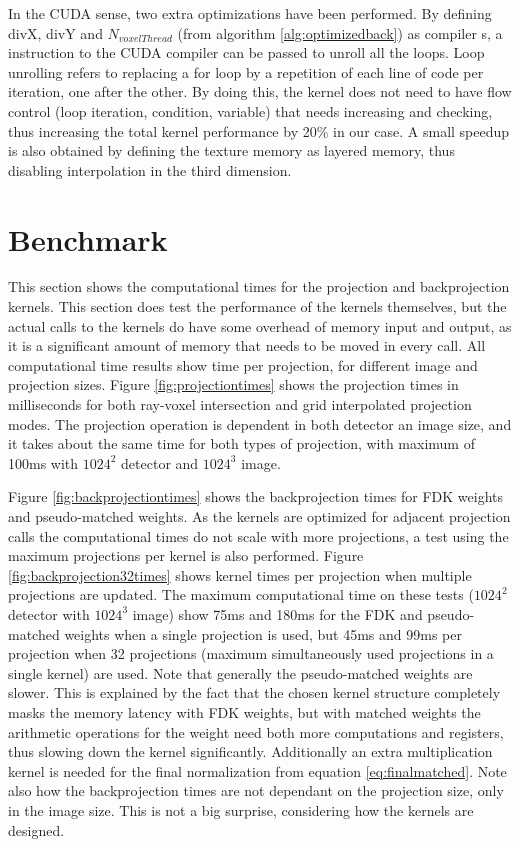 In the CUDA sense, two extra optimizations have been performed. By defining divX, divY and $N_{voxelThread}$ (from algorithm \ref{alg:optimizedback}) as compiler s, a instruction to the CUDA compiler can be passed to unroll all the loops. Loop unrolling refers to replacing a for loop by a repetition of each line of code per iteration, one after the other. By doing this, the kernel does not need to have flow control (loop iteration, condition, variable) that needs increasing and checking, thus increasing the total kernel performance by 20\% in our case. A small speedup is also obtained by defining the texture memory as layered memory, thus disabling interpolation in the third dimension.


\FloatBarrier
\section{Benchmark}\label{sec:speed}

This section shows the computational times for the projection and backprojection kernels. This section does test the performance of the kernels themselves, but the actual calls to the kernels do have some overhead of memory input and output, as it is a significant amount of memory that needs to be moved in every call. All computational time results show time per projection, for different image and projection sizes. Figure \ref{fig:projectiontimes} shows the projection times in milliseconds for both ray-voxel intersection and grid interpolated projection modes. The projection operation is dependent in both detector an image size, and it takes about the same time for both types of projection, with  maximum of 100ms with $1024^2$ detector and $1024^3$ image.


 Figure \ref{fig:backprojectiontimes} shows the backprojection times for FDK weights and pseudo-matched weights. As the kernels are optimized for adjacent projection calls the computational times do not scale with more projections, a test using the maximum projections per kernel is also performed. Figure \ref{fig:backprojection32times} shows kernel times per projection when multiple projections are updated. The maximum computational time on these tests ($1024^2$ detector with $1024^3$ image) show 75ms and 180ms for the FDK and pseudo-matched weights when a single projection is used, but 45ms and 99ms per projection when 32 projections (maximum simultaneously used projections in a single kernel) are used. Note that generally the pseudo-matched weights are slower. This is explained by the fact that the chosen kernel structure completely masks the memory latency with FDK weights, but with matched weights the arithmetic operations for the weight need both more computations and registers, thus slowing down the kernel significantly. Additionally an extra multiplication kernel is needed for the final normalization from equation \ref{eq:finalmatched}. Note also how the backprojection times are not dependant on the projection size, only in the image size. This is not a big surprise, considering how the kernels are designed.
 
